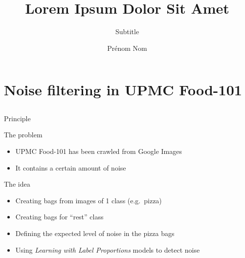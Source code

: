 \documentclass[compress,xcolor=table]{beamer}
\title{Lorem Ipsum \newline Dolor Sit Amet}
\subtitle{Subtitle} %
\date{\formatdate{22}{03}{2018}}
\author{Prénom Nom}
\begin{document}
\begin{frame}[plain]
	\titlepage
	\setcounter{framenumber}{0}
\end{frame}


\section{Noise filtering in UPMC Food-101} \subsection{}

\begin{frame}{Principle}
	
	\begin{alertblock}{The problem}
		
		\begin{itemize}
			\item
			UPMC Food-101 has been crawled from Google Images
			\item
			It contains a certain amount of noise
		\end{itemize}
		
	\end{alertblock}
	
	\begin{block}{The idea}
		
		\begin{itemize}
			\item
			Creating bags from images of 1 class (e.g.~pizza)
			\item
			Creating bags for ``rest'' class
			\item
			Defining the expected level of noise in the pizza bags
			\item
			Using \emph{Learning with Label Proportions} models to detect noise
		\end{itemize}
		
	\end{block}
	
\end{frame}
\end{document}
